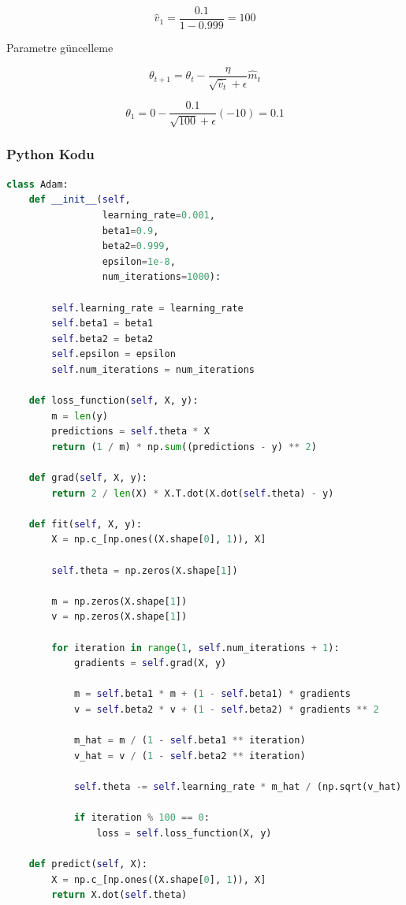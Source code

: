 \[ \hat{v}_1 = \frac{0.1}{1 - 0.999} = 100 \]

Parametre güncelleme

\[ \theta_{t+1} = \theta_t - \frac{\eta}{\sqrt{\hat{v}_t} + \epsilon} \hat{m}_t \]

\[ \theta_{1} = 0 - \frac{0.1}{\sqrt{100} + \epsilon} (-10) = 0.1 \]

\subsubsection{Python Kodu}

\begin{lstlisting}[language=Python]
class Adam:
    def __init__(self,
                 learning_rate=0.001,
                 beta1=0.9,
                 beta2=0.999,
                 epsilon=1e-8,
                 num_iterations=1000):

        self.learning_rate = learning_rate
        self.beta1 = beta1
        self.beta2 = beta2
        self.epsilon = epsilon
        self.num_iterations = num_iterations

    def loss_function(self, X, y):
        m = len(y)
        predictions = self.theta * X
        return (1 / m) * np.sum((predictions - y) ** 2)
        
    def grad(self, X, y):
        return 2 / len(X) * X.T.dot(X.dot(self.theta) - y)

    def fit(self, X, y):
        X = np.c_[np.ones((X.shape[0], 1)), X]

        self.theta = np.zeros(X.shape[1])
        
        m = np.zeros(X.shape[1])
        v = np.zeros(X.shape[1])

        for iteration in range(1, self.num_iterations + 1):
            gradients = self.grad(X, y)

            m = self.beta1 * m + (1 - self.beta1) * gradients
            v = self.beta2 * v + (1 - self.beta2) * gradients ** 2

            m_hat = m / (1 - self.beta1 ** iteration)
            v_hat = v / (1 - self.beta2 ** iteration)

            self.theta -= self.learning_rate * m_hat / (np.sqrt(v_hat) + self.epsilon)

            if iteration % 100 == 0:
                loss = self.loss_function(X, y)

    def predict(self, X):
        X = np.c_[np.ones((X.shape[0], 1)), X]
        return X.dot(self.theta)
\end{lstlisting}

